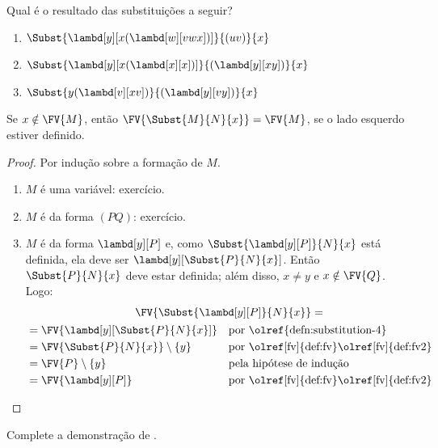 \documentclass[../../../include/open-logic-section]{subfiles}
\begin{document}
\begin{prob}
  Qual é o resultado das substituições a seguir?
  \begin{enumerate}
  \item $\Subst{\lambd[y][x(\lambd[w][vwx])]}{(uv)}{x}$
  \item $\Subst{\lambd[y][x(\lambd[x][x])]}{(\lambd[y][xy])}{x}$
  \item $\Subst{y(\lambd[v][xv])}{(\lambd[y][vy])}{x}$
  \end{enumerate}
\end{prob}

\begin{thm} 
  Se $x \notin \FV{M}$, então $\FV{\Subst{M}{N}{x}} = \FV{M}$, se
  o lado esquerdo estiver definido.
\end{thm}

\begin{proof}
  Por indução sobre a formação de $M$.
  \begin{enumerate}
  \item $M$ é uma variável: exercício.
  \item $M$ é da forma $(PQ)$: exercício.
  \item $M$ é da forma $\lambd[y][P]$ e, como
    $\Subst{\lambd[y][P]}{N}{x}$ está definida, ela deve ser
    $\lambd[y][\Subst{P}{N}{x}]$. Então $\Subst{P}{N}{x}$ deve estar
    definida; além disso, $x \neq y$ e $x \notin \FV{Q}$. Logo:
    \begin{multline*}
      \FV{\Subst{\lambd[y][P]}{N}{x}} = \\
    \begin{aligned}
      & = \FV{\lambd[y][\Subst{P}{N}{x}]} &&
      \text{por \olref{defn:substitution-4}}\\
      & = \FV{\Subst{P}{N}{x}} \setminus \{y\} &&
      \text{por \olref[fv]{def:fv}\olref[fv]{def:fv2}}\\
      & = \FV{P} \setminus \{y\} && \text{pela hipótese de indução} \\
      & = \FV{\lambd[y][P]} && \text{por \olref[fv]{def:fv}\olref[fv]{def:fv2}}
    \end{aligned}
    \end{multline*}
  \end{enumerate}
\end{proof}

\begin{prob}
  Complete a demonstração de .
\end{prob}
\end{document}

